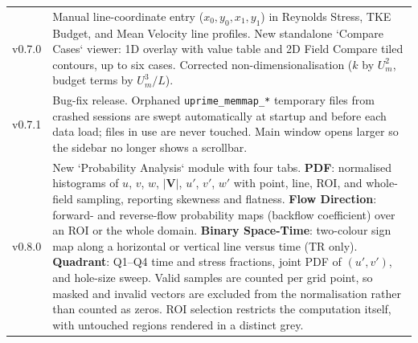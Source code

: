 \begin{longtable}{lp{12cm}}
v0.7.0 & Manual line-coordinate entry ($x_0, y_0, x_1, y_1$) in Reynolds Stress, TKE Budget, and Mean Velocity line profiles. New standalone `Compare Cases` viewer: 1D overlay with value table and 2D Field Compare tiled contours, up to six cases. Corrected non-dimensionalisation ($k$ by $U_m^2$, budget terms by $U_m^3/L$). \\
v0.7.1 & Bug-fix release. Orphaned \texttt{uprime\_memmap\_*} temporary files from crashed sessions are swept automatically at startup and before each data load; files in use are never touched. Main window opens larger so the sidebar no longer shows a scrollbar. \\
v0.8.0 & New `Probability Analysis` module with four tabs. \textbf{PDF}: normalised histograms of $u$, $v$, $w$, $|\mathbf{V}|$, $u'$, $v'$, $w'$ with point, line, ROI, and whole-field sampling, reporting skewness and flatness. \textbf{Flow Direction}: forward- and reverse-flow probability maps (backflow coefficient) over an ROI or the whole domain. \textbf{Binary Space-Time}: two-colour sign map along a horizontal or vertical line versus time (TR only). \textbf{Quadrant}: Q1--Q4 time and stress fractions, joint PDF of $(u', v')$, and hole-size sweep. Valid samples are counted per grid point, so masked and invalid vectors are excluded from the normalisation rather than counted as zeros. ROI selection restricts the computation itself, with untouched regions rendered in a distinct grey. \\
\bottomrule
\end{longtable}

